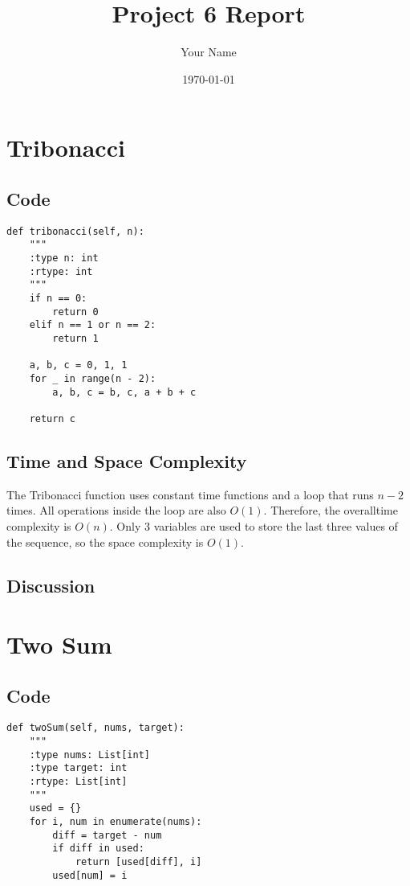 \documentclass[12pt]{article}
\title{Project 6 Report}
\author{Your Name}
\date{\today}
\begin{document}
\maketitle

\tableofcontents
\newpage

\section{Tribonacci}
\subsection{Code}

\begin{lstlisting}
def tribonacci(self, n):
    """
    :type n: int
    :rtype: int
    """
    if n == 0:
        return 0
    elif n == 1 or n == 2:
        return 1

    a, b, c = 0, 1, 1
    for _ in range(n - 2):
        a, b, c = b, c, a + b + c

    return c
\end{lstlisting}

\subsection{Time and Space Complexity}
The Tribonacci function uses constant time functions and a loop that runs \( n-2 \) times.
All operations inside the loop are also \( O(1) \). Therefore, the overalltime complexity is
$O(n)$. Only 3 variables are used to store the last three values of the sequence,
so the space complexity is \( O(1) \).

\subsection{Discussion}

\newpage

\section{Two Sum}
\subsection{Code}
\lstset{
    caption=Two Sum,
}
\begin{lstlisting}
def twoSum(self, nums, target):
    """
    :type nums: List[int]
    :type target: int
    :rtype: List[int]
    """
    used = {}
    for i, num in enumerate(nums):
        diff = target - num
        if diff in used:
            return [used[diff], i]
        used[num] = i
\end{lstlisting}
\end{document}

